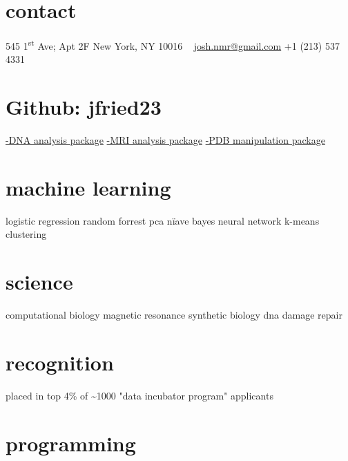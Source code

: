 \documentclass[]{friggeri-cv} %
\begin{document}


\begin{aside}%
\section{contact}
545 1\textsuperscript{st} Ave; Apt 2F
New York, NY 10016
~
\href{mailto:josh.nmr@gmail.com}{josh.nmr@gmail.com}{\color{brown} } 
+1 (213) 537 4331{\color{brown} }
\section{ \small Github: jfried23}{}
\href{https://github.com/jfried23/sequence_profile}{\footnotesize-DNA analysis package}
\href{https://github.com/jfried23/MR_Tools}{\footnotesize-MRI analysis package}
\href{https://github.com/jfried23/pdbedit}{\footnotesize-PDB manipulation package}
\section{machine learning}
logistic regression
random forrest
pca
n{\"i}ave bayes
neural network
k-means clustering
\section{science}
computational biology
magnetic resonance
synthetic biology
dna damage repair
\section{recognition}
placed in top 4\% of \textasciitilde1000 "data incubator program" applicants 
~
\end{aside}


\section{programming}
\end{document}
